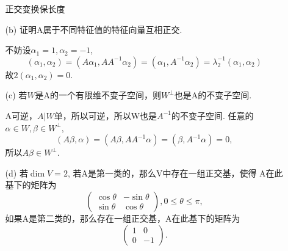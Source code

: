 \begin{itemize}
\begin{itemize}
        \begin{solution}
            正交变换保长度
        \end{solution}
        \item [(b)] 证明A属于不同特征值的特征向量互相正交.
        
        \begin{solution}
            不妨设$\alpha_1 = 1, \alpha_2 = -1$,
            $$(\alpha_1, \alpha_2) = (A\alpha_1, AA^{-1}\alpha_2) = (\alpha_1, A^{-1}\alpha_2) = \lambda_2^{-1} (\alpha_1, \alpha_2)$$
            故$2(\alpha_1, \alpha_2) = 0$.
        \end{solution}
        \item [(c)] 若$W$是A的一个有限维不变子空间，则$W^{\perp}$也是A的不变子空间.
        
        \begin{solution}
            A可逆，$A|W$单，所以可逆，所以W也是$A^{-1}$的不变子空间.
            任意的$\alpha \in W, \beta \in W^{\perp}$,
            $$(A\beta, \alpha) = (A\beta, AA^{-1}\alpha) = (\beta, A^{-1}\alpha) = 0,$$
            所以$A\beta \in W^{\perp}$.
        \end{solution}
        \item [(d)] 若$\dim V = 2$, 若A是第一类的，那么V中存在一组正交基，使得
        A在此基下的矩阵为
        \begin{equation}
        \nonumber
        \begin{pmatrix}
            \cos \theta& -\sin \theta\\
            \sin \theta&  \cos \theta 
        \end{pmatrix},
        0 \le \theta \le \pi,
        \end{equation}
        如果A是第二类的，那么存在一组正交基，A在此基下的矩阵为
        \begin{equation}
        \nonumber
        \begin{pmatrix}
            1& 0\\
            0&-1 
        \end{pmatrix}.
        \end{equation}


\end{itemize}
\end{itemize}

